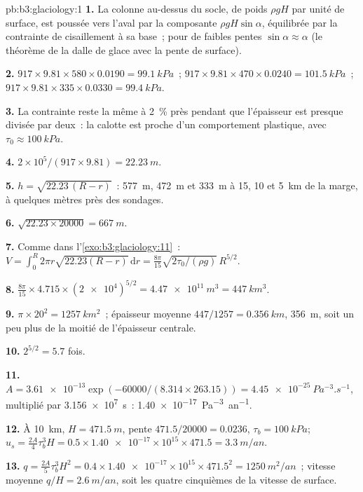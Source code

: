 \begin{solution}{pb:b3:glaciology:1}
\textbf{1.} La colonne au-dessus du socle, de poids $\rho gH$ par unité de surface, est
poussée vers l'aval par la composante $\rho gH\sin\alpha$, équilibrée par la
contrainte de cisaillement à sa base~; pour de faibles pentes $\sin\alpha \approx \alpha$ (le
théorème de la dalle de glace avec la pente de surface).

\textbf{2.} $917\times9.81\times580\times0.0190 = \qty{99.1}{kPa}$~;
$917\times9.81\times470\times0.0240 = \qty{101.5}{kPa}$~; $917\times9.81
\times335\times0.0330 = \qty{99.4}{kPa}$.

\textbf{3.} La contrainte reste la même à \qty{2}{\percent} près pendant que
l'épaisseur est presque divisée par deux~: la calotte est proche d'un comportement plastique, avec $\tau_0 \approx
\qty{100}{kPa}$.

\textbf{4.} $2\times10^5/(917\times9.81) = \qty{22.23}{m}$.

\textbf{5.} $h = \sqrt{22.23\,(R - r)}$~: \qty{577}{m}, \qty{472}{m} et
\qty{333}{m} à 15, 10 et \qty{5}{km} de la marge, à quelques mètres
près des sondages.

\textbf{6.} $\sqrt{22.23\times20000} = \qty{667}{m}$.

\textbf{7.} Comme dans l'\cref{exo:b3:glaciology:11}~: $V = \int_0^R2\pi r
\sqrt{22.23(R - r)}\,\mathrm dr = \frac{8\pi}{15}\sqrt{2\tau_0/(\rho
g)}\,R^{5/2}$.

\textbf{8.} $\frac{8\pi}{15}\times4.715\times(\num{2e4})^{5/2} =
\qty{4.47e11}{m^3} = \qty{447}{km^3}$.

\textbf{9.} $\pi\times20^2 = \qty{1257}{km^2}$~; épaisseur moyenne
$447/1257 = \qty{0.356}{km}$, \qty{356}{m}, soit un peu plus de la moitié de
l'épaisseur centrale.

\textbf{10.} $2^{5/2} = 5.7$ fois.

\textbf{11.} $A = \num{3.61e-13}\exp(-60000/(8.314\times263.15)) =
\qty{4.45e-25}{Pa^{-3}.s^{-1}}$, multiplié par \qty{3.156e7}{s}~:
\qty{1.40e-17}{Pa^{-3}.an^{-1}}.

\textbf{12.} À \qty{10}{km}, $H = \qty{471.5}{m}$, pente $471.5/20000 =
\num{0.0236}$, $\tau_b = \qty{100}{kPa}$; $u_s = \tfrac{2A}{4}\tau_b^3H =
0.5\times\num{1.40e-17}\times10^{15}\times471.5 = \qty{3.3}{m/an}$.

\textbf{13.} $q = \tfrac{2A}{5}\tau_b^3H^2 = 0.4\times\num{1.40e-17}
\times10^{15}\times471.5^2 = \qty{1250}{m^2/an}$~; vitesse moyenne $q/H =
\qty{2.6}{m/an}$, soit les quatre cinquièmes de la vitesse de surface.


\end{solution}

